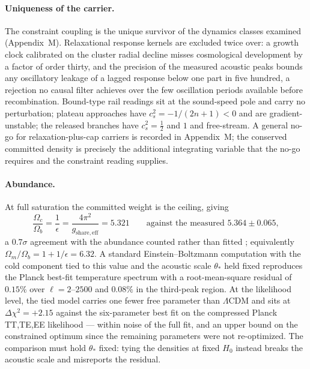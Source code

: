 \documentclass[11pt]{article}
\begin{document}
\paragraph{Uniqueness of the carrier.}
The constraint coupling is the unique survivor of the dynamics classes examined (Appendix~M). Relaxational response kernels are excluded twice over: a growth clock calibrated on the cluster radial decline misses cosmological development by a factor of order thirty, and the precision of the measured acoustic peaks bounds any oscillatory leakage of a lagged response below one part in five hundred, a rejection no causal filter achieves over the few oscillation periods available before recombination. Bound-type rail readings sit at the sound-speed pole and carry no perturbation; plateau approaches have $c_s^2=-1/(2n{+}1)<0$ and are gradient-unstable; the released branches have $c_s^2=\tfrac12$ and $1$ and free-stream. A general no-go for relaxation-plus-cap carriers is recorded in Appendix~M; the conserved committed density is precisely the additional integrating variable that the no-go requires and the constraint reading supplies.

\paragraph{Abundance.}
At full saturation the committed weight is the ceiling, giving
\[
\frac{\Omega_c}{\Omega_b}=\frac{1}{\epsilon}=\frac{4\pi^2}{g_{\mathrm{share,eff}}}=5.321
\qquad\text{against the measured } 5.364\pm0.065,
\]
a $0.7\sigma$ agreement with the abundance counted rather than fitted \citep{Planck2020}; equivalently $\Omega_m/\Omega_b=1+1/\epsilon=6.32$. A standard Einstein--Boltzmann computation \citep{Lewis2000} with the cold component tied to this value and the acoustic scale $\theta_*$ held fixed reproduces the Planck best-fit temperature spectrum with a root-mean-square residual of $0.15\%$ over $\ell=2$--$2500$ and $0.08\%$ in the third-peak region. At the likelihood level, the tied model carries one fewer free parameter than $\Lambda$CDM and sits at $\Delta\chi^2=+2.15$ against the six-parameter best fit on the compressed Planck TT,TE,EE likelihood \citep{PrinceDunkley2019} --- within noise of the full fit, and an upper bound on the constrained optimum since the remaining parameters were not re-optimized. The comparison must hold $\theta_*$ fixed: tying the densities at fixed $H_0$ instead breaks the acoustic scale and misreports the residual.
\end{document}

